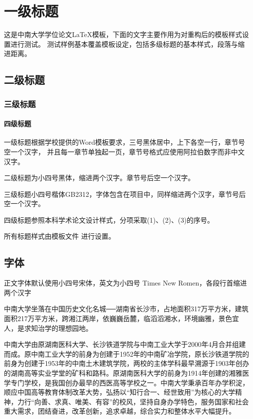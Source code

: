 \chapter{一级标题}

这是中南大学学位论文\LaTeX{}模板，下面的文字主要作用为对重构后的模板样式设置进行测试。
测试样例基本覆盖模板设定，包括多级标题的基本样式，段落与缩进距离。

\section{二级标题}

\subsection{三级标题}

\subsubsection{四级标题}

一级标题根据学校提供的Word模板要求，三号黑体居中，上下各空一行，章节号空一个汉字，
并且每一章节单独起一页，章节号格式应使用阿拉伯数字而非中文汉字。

二级标题为小四号黑体，缩进两个汉字。章节号后空一个汉字。

三级标题小四号楷体GB2312，字体包含在项目中，同样缩进两个汉字，章节号后空一个汉字。

四级标题参照本科学术论文设计样式，分项采取(1)、(2)、(3)的序号。

所有标题样式由模板文件  进行设置。

\section{字体}

正文字体默认使用小四号宋体，英文为小四号 Times New Romen，各段行首缩进两个汉字

中南大学\cite{csu__2020}坐落在中国历史文化名城──湖南省长沙市，占地面积317万平方米，建筑面积217万平方米，跨湘江两岸，依巍巍岳麓，临滔滔湘水，环境幽雅，景色宜人，是求知治学的理想园地。

中南大学由原湖南医科大学、长沙铁道学院与中南工业大学于2000年4月合并组建而成。原中南工业大学的前身为创建于1952年的中南矿冶学院，原长沙铁道学院的前身为创建于1953年的中南土木建筑学院，两校的主体学科最早溯源于1903年创办的湖南高等实业学堂的矿科和路科。原湖南医科大学的前身为1914年创建的湘雅医学专门学校，是我国创办最早的西医高等学校之一。中南大学秉承百年办学积淀，顺应中国高等教育体制改革大势，弘扬以“知行合一、经世致用”为核心的大学精神，力行“向善、求真、唯美、有容”的校风，坚持自身办学特色，服务国家和社会重大需求，团结奋进，改革创新，追求卓越，综合实力和整体水平大幅提升。

